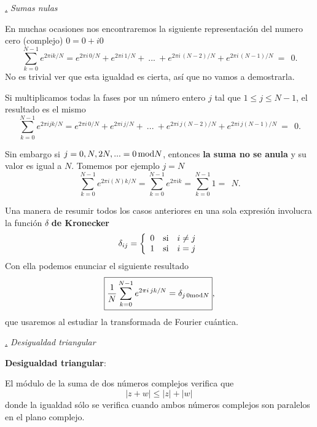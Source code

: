 \documentclass[a4paper,11pt]{book} %
\numberwithin{equation}{chapter}
\def\subsubiContadorIt{\par\addtocounter{subsubsection}{1}\underline{\it\thesubsubsection.}\hskip0.5cm \setcounter{subsubsubsectionIt}{0}}
\newcommand{\SubsubiIt}[1]{
		\subsubiContadorIt \textit{#1}
	}
\newcounter{subsubsubsectionIt}[subsubsection]
\begin{document}
			\SubsubiIt{Sumas nulas}
			
En muchas ocasiones nos encontraremos la siguiente representación del numero cero (complejo) $0 = 0 + i 0$
	\begin{equation}
\sum_{k=0}^{N-1} e^{2\pi i k/N} =   e^{2\pi i\, 0/N} +  e^{2\pi i\, 1/N}  +~...~ +   e^{2\pi i\, (N-2)/N}+   e^{2\pi i\, (N-1)/N} ~=~  ~0.
	\end{equation}
No es trivial ver que esta igualdad es cierta, así que no vamos a demostrarla.
			
Si multiplicamos todas la fases por un número entero $j$ tal que $1\leq j \leq N-1$, el resultado es el mismo
\begin{equation}
\sum_{k=0}^{N-1} e^{2\pi i j k/N} =   e^{2\pi i \, 0/N} +  e^{2\pi i \, j/N}  +~...~ +   e^{2\pi i \, j(N-2)/N}+   e^{2\pi i \, j(N-1)/N} ~=~  ~0.
\end{equation}

Sin embargo si $j = 0, N, 2N,... = 0\,\hbox{mod} N$, entonces \textbf{la suma no se anula} y su valor es igual a $N$. Tomemos por ejemplo $j=N$ 
\begin{equation}
\sum_{k=0}^{N-1} e^{2\pi i (N) k/N} = \sum_{k=0}^{N-1} e^{2\pi i  k}  =  \sum_{k=0}^{N-1} 1 =~  ~N.
\end{equation}

Una manera de resumir todos los casos anteriores en una sola expresión involucra la función $\delta$ \textbf{de Kronecker}
	\begin{equation} \label{ec_fundamentos_delta_de_kronecker}
	\delta_{ij} = \left\{ \begin{array}{rcl} 0 & \hbox{si} & i\neq j \\ 1 & \hbox{si} & i = j \end{array} \right.
	\end{equation}
Con ella podemos enunciar el siguiente resultado 
	\begin{equation}
	\boxed{\frac{1}{N}\sum_{k=0}^{N-1} e^{2\pi i \, j k/N} =  \delta_{j\, 0{\rm mod} N}},
	\end{equation}
que usaremos al estudiar la transformada de Fourier cuántica.
			
			\SubsubiIt{Desigualdad triangular}
			
\begin{mybox_gray2}{}			
\textbf{Desigualdad triangular}:

El módulo de la suma de dos números complejos verifica que
\begin{equation}
| z+w| \leq |z| + |w| \,
\end{equation}
donde la igualdad sólo se verifica cuando ambos números complejos son paralelos en el plano complejo. 
\end{mybox_gray2}
	
\end{document}
